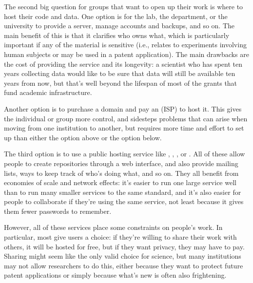 \documentclass{book}
\begin{document}
The second big question for groups that want to open up their work is
where to host their code and data. One option is for the lab, the
department, or the university to provide a server, manage accounts and
backups, and so on. The main benefit of this is that it clarifies who
owns what, which is particularly important if any of the material is
sensitive (i.e., relates to experiments involving human subjects or may
be used in a patent application). The main drawbacks are the cost of
providing the service and its longevity: a scientist who has spent ten
years collecting data would like to be sure that data will still be
available ten years from now, but that's well beyond the lifespan of
most of the grants that fund academic infrastructure.

Another option is to purchase a domain and pay an
 (ISP) to host it. This gives
the individual or group more control, and sidesteps problems that can
arise when moving from one institution to another, but requires more
time and effort to set up than either the option above or the option
below.

The third option is to use a public hosting service like
,
,
, or
. All of these allow people to
create repositories through a web interface, and also provide mailing
lists, ways to keep track of who's doing what, and so on. They all
benefit from economies of scale and network effects: it's easier to run
one large service well than to run many smaller services to the same
standard, and it's also easier for people to collaborate if they're
using the same service, not least because it gives them fewer passwords
to remember.

However, all of these services place some constraints on people's work.
In particular, most give users a choice: if they're willing to share
their work with others, it will be hosted for free, but if they want
privacy, they may have to pay. Sharing might seem like the only valid
choice for science, but many institutions may not allow researchers to
do this, either because they want to protect future patent applications
or simply because what's new is often also frightening.
\end{document}
